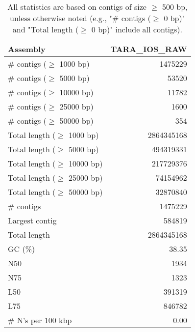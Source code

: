 \documentclass[12pt,a4paper]{article}
\begin{document}
\begin{table}[ht]
\begin{center}
\caption{All statistics are based on contigs of size $\geq$ 500 bp, unless otherwise noted (e.g., "\# contigs ($\geq$ 0 bp)" and "Total length ($\geq$ 0 bp)" include all contigs).}
\begin{tabular}{|l*{1}{|r}|}
\hline
Assembly & TARA\_IOS\_RAW \\ \hline
\# contigs ($\geq$ 1000 bp) & 1475229 \\ \hline
\# contigs ($\geq$ 5000 bp) & 53520 \\ \hline
\# contigs ($\geq$ 10000 bp) & 11782 \\ \hline
\# contigs ($\geq$ 25000 bp) & 1600 \\ \hline
\# contigs ($\geq$ 50000 bp) & 354 \\ \hline
Total length ($\geq$ 1000 bp) & 2864345168 \\ \hline
Total length ($\geq$ 5000 bp) & 494319331 \\ \hline
Total length ($\geq$ 10000 bp) & 217729376 \\ \hline
Total length ($\geq$ 25000 bp) & 74154962 \\ \hline
Total length ($\geq$ 50000 bp) & 32870840 \\ \hline
\# contigs & 1475229 \\ \hline
Largest contig & 584819 \\ \hline
Total length & 2864345168 \\ \hline
GC (\%) & 38.35 \\ \hline
N50 & 1934 \\ \hline
N75 & 1323 \\ \hline
L50 & 391319 \\ \hline
L75 & 846782 \\ \hline
\# N's per 100 kbp & 0.00 \\ \hline
\end{tabular}
\end{center}
\end{table}
\end{document}
